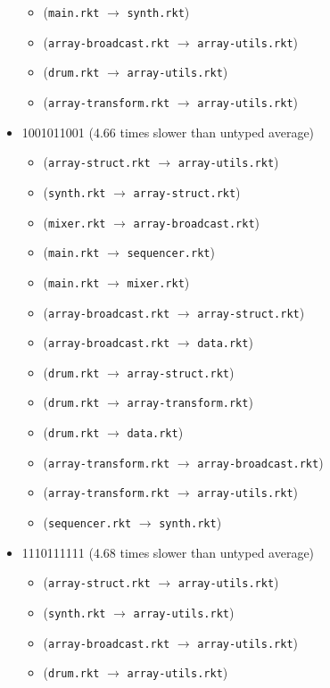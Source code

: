 \documentclass{article}
\newcommand{\mono}[1]{\texttt{#1}}
\begin{document}
\begin{itemize}
\begin{itemize}
  \item (\mono{main.rkt} $\rightarrow$ \mono{synth.rkt})
  \item (\mono{array-broadcast.rkt} $\rightarrow$ \mono{array-utils.rkt})
  \item (\mono{drum.rkt} $\rightarrow$ \mono{array-utils.rkt})
  \item (\mono{array-transform.rkt} $\rightarrow$ \mono{array-utils.rkt})
  \end{itemize}
\item 1001011001 (4.66 times slower than untyped average)
  \begin{itemize}
  \item (\mono{array-struct.rkt} $\rightarrow$ \mono{array-utils.rkt})
  \item (\mono{synth.rkt} $\rightarrow$ \mono{array-struct.rkt})
  \item (\mono{mixer.rkt} $\rightarrow$ \mono{array-broadcast.rkt})
  \item (\mono{main.rkt} $\rightarrow$ \mono{sequencer.rkt})
  \item (\mono{main.rkt} $\rightarrow$ \mono{mixer.rkt})
  \item (\mono{array-broadcast.rkt} $\rightarrow$ \mono{array-struct.rkt})
  \item (\mono{array-broadcast.rkt} $\rightarrow$ \mono{data.rkt})
  \item (\mono{drum.rkt} $\rightarrow$ \mono{array-struct.rkt})
  \item (\mono{drum.rkt} $\rightarrow$ \mono{array-transform.rkt})
  \item (\mono{drum.rkt} $\rightarrow$ \mono{data.rkt})
  \item (\mono{array-transform.rkt} $\rightarrow$ \mono{array-broadcast.rkt})
  \item (\mono{array-transform.rkt} $\rightarrow$ \mono{array-utils.rkt})
  \item (\mono{sequencer.rkt} $\rightarrow$ \mono{synth.rkt})
  \end{itemize}
\item 1110111111 (4.68 times slower than untyped average)
  \begin{itemize}
  \item (\mono{array-struct.rkt} $\rightarrow$ \mono{array-utils.rkt})
  \item (\mono{synth.rkt} $\rightarrow$ \mono{array-utils.rkt})
  \item (\mono{array-broadcast.rkt} $\rightarrow$ \mono{array-utils.rkt})
  \item (\mono{drum.rkt} $\rightarrow$ \mono{array-utils.rkt})

\end{itemize}
\end{itemize}
\end{document}
